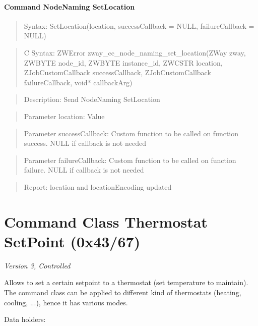 \paragraph{Command NodeNaming SetLocation}
\begin{quote}Syntax: SetLocation(location, successCallback = NULL, failureCallback = NULL)\end{quote}
\begin{quote}C Syntax: ZWError zway\_cc\_node\_naming\_set\_location(ZWay zway, ZWBYTE node\_id, ZWBYTE instance\_id, ZWCSTR location, ZJobCustomCallback successCallback, ZJobCustomCallback failureCallback, void* callbackArg)\end{quote}
\begin{quote}Description: Send NodeNaming SetLocation\end{quote}
\begin{quote}Parameter location: Value\end{quote}
\begin{quote}Parameter successCallback: Custom function to be called on function success. NULL if callback is not needed\end{quote}
\begin{quote}Parameter failureCallback: Custom function to be called on function failure. NULL if callback is not needed\end{quote}
\begin{quote}Report: location and locationEncoding updated\end{quote}


\section{Command Class Thermostat SetPoint (0x43/67)}

\textit{Version 3, Controlled}
\newline

Allows to set a certain setpoint to a thermostat (set temperature to maintain). The command class can be applied to different kind of thermostats (heating, cooling, ...), hence it has various modes.
\newline

\noindent
Data holders:

